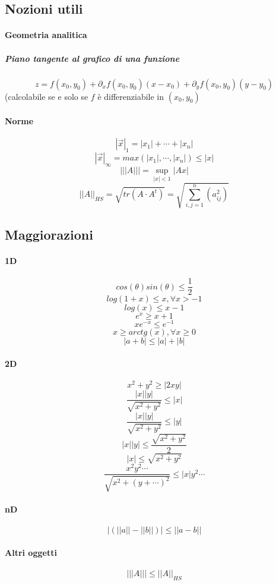 \documentclass[a4paper,12pt]{book}
\begin{document}
\subsection{Nozioni utili}
\paragraph{Geometria analitica}
\subparagraph{Piano tangente al grafico di una funzione}
$$z = f(x_0, y_0) + \partial_x f(x_0, y_0) (x-x_0) + \partial_y f(x_0, y_0) (y - y_0) $$
(calcolabile se e solo se $f$ è differenziabile in $(x_0, y_0)$

\paragraph{Norme}
$$|\vec{x}|_1 = |x_1|+\cdots+|x_n|$$
$$|\vec{x}|_\infty = max( |x_1|,\cdots,|x_n|) \leq |x|$$
$$|||A||| = \sup_{|x|<1}|Ax|$$
$$||A||_{HS} = \sqrt{tr(A\cdot A^t)} = \sqrt{\sum_{i,j=1}^n (a_{ij}^2)}$$

\subsection{Maggiorazioni}
\paragraph{1D}
$$cos(\theta)sin(\theta) \leq \frac{1}{2}$$
$$ log(1+x) \leq x, \forall x > -1$$
$$ log(x) \leq x-1 $$
$$ e^x \geq x+1 $$
$$xe^{-x} \leq e^{-1}$$
$$x \geq arctg(x), \forall x \geq 0$$
$$|a+b|\leq |a|+|b|$$
\paragraph{2D}
$$x^2+y^2\geq |2xy|$$
$$\dfrac{|x||y|}{\sqrt{x^2+y^2}} \leq |x|$$
$$\dfrac{|x||y|}{\sqrt{x^2+y^2}} \leq |y|$$
$$|x||y| \leq \dfrac{\sqrt{x^2+y^2}}{2}$$
$$|x| \leq \sqrt{x^2+y^2} $$
$$\dfrac{x^2y^2\cdots}{\sqrt{x^2+(y+\cdots)^2}} \leq |x|y^2\cdots $$
\paragraph{nD}
$$|(||a||-||b||)|\leq||a-b||$$
\paragraph{Altri oggetti}
$$|||A||| \leq ||A||_{HS}$$
\end{document}

